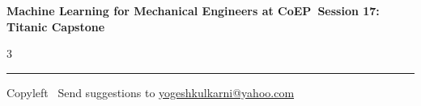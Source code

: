 \documentclass[8pt,landscape]{article}
\begin{document}
\footnotesize

\begin{center}
\Large{\textbf{Machine Learning for Mechanical Engineers at CoEP\ Session 17: Titanic Capstone}}
\end{center}

\begin{multicols}{3}

\end{multicols}

\rule{\linewidth}{0.25pt}
\scriptsize
Copyleft \textcopyleft\  Send suggestions to
\href{http://www.yogeshkulkarni.com}{yogeshkulkarni@yahoo.com}
\end{document}
